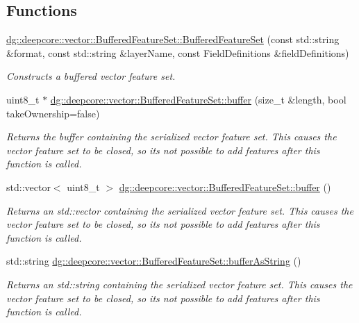 \subsection*{Functions}
\begin{DoxyCompactItemize}
\item 
\hyperlink{group___vector_module_ga13bed828345853b15d61ba90d6df392e}{dg\+::deepcore\+::vector\+::\+Buffered\+Feature\+Set\+::\+Buffered\+Feature\+Set} (const std\+::string \&format, const std\+::string \&layer\+Name, const Field\+Definitions \&field\+Definitions)
\begin{DoxyCompactList}\small\item\em Constructs a buffered vector feature set. \end{DoxyCompactList}\item 
uint8\+\_\+t $\ast$ \hyperlink{group___vector_module_ga3541fd309ad0269dbdb1a64657a5a11d}{dg\+::deepcore\+::vector\+::\+Buffered\+Feature\+Set\+::buffer} (size\+\_\+t \&length, bool take\+Ownership=false)
\begin{DoxyCompactList}\small\item\em Returns the buffer containing the serialized vector feature set. This causes the vector feature set to be closed, so it\textquotesingle{}s not possible to add features after this function is called. \end{DoxyCompactList}\item 
std\+::vector$<$ uint8\+\_\+t $>$ \hyperlink{group___vector_module_ga0a390de9fa273210eb7d905538d22b19}{dg\+::deepcore\+::vector\+::\+Buffered\+Feature\+Set\+::buffer} ()
\begin{DoxyCompactList}\small\item\em Returns an std\+::vector containing the serialized vector feature set. This causes the vector feature set to be closed, so it\textquotesingle{}s not possible to add features after this function is called. \end{DoxyCompactList}\item 
std\+::string \hyperlink{group___vector_module_gaa41d91dcbee14ef2363b9acecb332b1f}{dg\+::deepcore\+::vector\+::\+Buffered\+Feature\+Set\+::buffer\+As\+String} ()
\begin{DoxyCompactList}\small\item\em Returns an std\+::string containing the serialized vector feature set. This causes the vector feature set to be closed, so it\textquotesingle{}s not possible to add features after this function is called. \end{DoxyCompactList}\item 

\end{DoxyCompactItemize}
